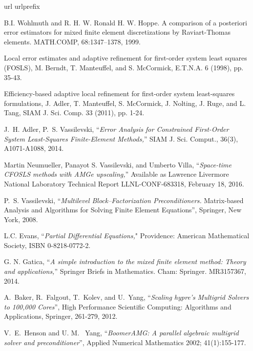 \documentclass[a4paper,12pt]{amsart}
\numberwithin{equation}{section}
\begin{document}
\begin{thebibliography}{99}
\expandafter\ifx\csname url\endcsname\relax
  \def\url#1{\texttt{#1}}\fi
\expandafter\ifx\csname urlprefix\endcsname\relax\def\urlprefix{URL }\fi

B.I. Wohlmuth and R. H. W. Ronald H. W. Hoppe. A comparison of a posteriori error estimators for mixed finite element discretizations by Raviart-Thomas elements. MATH.COMP, 68:1347–1378, 1999.

Local error estimates and adaptive refinement for first-order system least squares (FOSLS), M. Berndt, T. Manteuffel, and S. McCormick, E.T.N.A. 6 (1998), pp. 35-43.

Efficiency-based adaptive local refinement for first-order system least-squares formulations, J. Adler, T. Manteuffel, S. McCormick, J. Nolting, J. Ruge, and L. Tang, SIAM J. Sci. Comp. 33 (2011), pp. 1-24. 

{\sc J.~H. Adler, P.~S. Vassilevski,}
``{\em Error Analysis for Constrained First-Order System Least-Squares Finite-Element Methods,}''
SIAM J. Sci. Comput., 36(3), A1071-A1088, 2014.

Martin Neumueller, Panayot S. Vassilevski, and Umberto Villa,
``{\em Space-time CFOSLS methods with AMGe upscaling,}''
Available as Lawrence Livermore National Laboratory Technical Report LLNL-CONF-683318, February 18, 2016.

{\sc P.~S. Vassilevski,}
``{\em Multilevel Block--Factorization Preconditioners.} 
Matrix-based Analysis and Algorithms for Solving Finite Element Equations'',
Springer, New York, 2008.

{\sc L.C. Evans,}
 ``{\em Partial Differential Equations,}" Providence: American Mathematical Society, ISBN 0-8218-0772-2. 

{\sc  G. N. Gatica,} ``{\em A simple introduction to the mixed finite element method: Theory and applications,}'' Springer Briefs in Mathematics. Cham: Springer. MR3157367, 2014.

{\sc A.~Baker, R.~Falgout, T.~Kolev, and U.~Yang,} 
``{\em Scaling hypre's Multigrid Solvers to 100,000 Cores}'',
High Performance Scientific Computing: Algorithms and Applications, Springer,  261-279, 2012.

{\sc V.~E.~Henson and U. M.~ Yang,} ``{\em Boomer{AMG}: A parallel algebraic multigrid solver and preconditioner}'',
Applied Numerical Mathematics 2002; 41(1):155-177.

\end{thebibliography}
\end{document}
